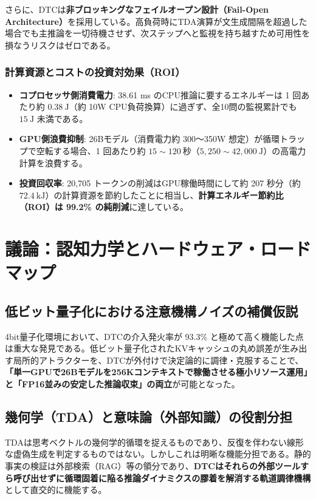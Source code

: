 \documentclass[11pt,a4paper]{article}
\begin{document}
さらに、DTCは\textbf{非ブロッキングなフェイルオープン設計（Fail-Open Architecture）}を採用している。高負荷時にTDA演算が文生成間隔を超過した場合でも主推論を一切待機させず、次ステップへと監視を持ち越すため可用性を損なうリスクはゼロである。

\subsubsection{計算資源とコストの投資対効果（ROI）}
\begin{itemize}
    \item \textbf{コプロセッサ側消費電力}: 38.61 ms のCPU推論に要するエネルギーは 1 回あたり約 $0.38\ \mathrm{J}$（約 10W CPU負荷換算）に過ぎず、全10問の監視累計でも $15\ \mathrm{J}$ 未満である。
    \item \textbf{GPU側浪費抑制}: 26Bモデル（消費電力約 300〜350W 想定）が循環トラップで空転する場合、1 回あたり約 $15\sim120\ \mathrm{秒}$（$5,250\sim42,000\ \mathrm{J}$）の高電力計算を浪費する。
    \item \textbf{投資回収率}: 20,705 トークンの削減はGPU稼働時間にして約 207 秒分（約 $72.4\ \mathrm{kJ}$）の計算資源を節約したことに相当し、\textbf{計算エネルギー節約比（ROI）は 99.2\% の純削減}に達している。
\end{itemize}

\section{議論：認知力学とハードウェア・ロードマップ}

\subsection{低ビット量子化における注意機構ノイズの補償仮説}
4bit量子化環境において、DTCの介入発火率が 93.3\% と極めて高く機能した点は重大な発見である。低ビット量子化されたKVキャッシュの丸め誤差が生み出す局所的アトラクターを、DTCが外付けで決定論的に調律・克服することで、\textbf{「単一GPUで26Bモデルを256Kコンテキストで稼働させる極小リソース運用」と「FP16並みの安定した推論収束」の両立}が可能となった。

\subsection{幾何学（TDA）と意味論（外部知識）の役割分担}
TDAは思考ベクトルの幾何学的循環を捉えるものであり、反復を伴わない線形な虚偽生成を判定するものではない。しかしこれは明晰な機能分担である。静的事実の検証は外部検索（RAG）等の領分であり、\textbf{DTCはそれらの外部ツールすら呼び出せずに循環固着に陥る推論ダイナミクスの膠着を解消する軌道調律機構}として直交的に機能する。
\end{document}
